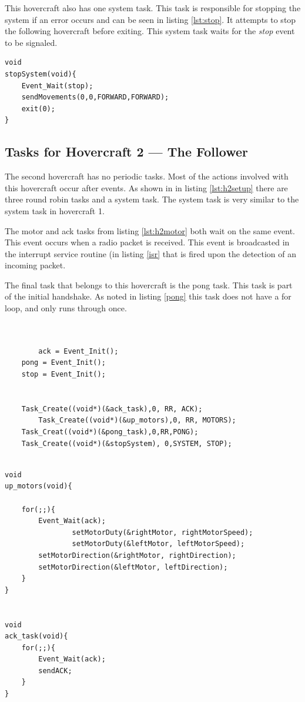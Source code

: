 This hovercraft also has one system task. This task is responsible for
stopping the system if an error occurs and can be seen in listing \ref{lst:stop}. It attempts to stop the following
hovercraft before exiting. This system task waits for the \textit{stop} event
to be signaled.

\begin{lstlisting}[label=lst:stop, float=th, caption={\texttt{STOP} Task}]
void
stopSystem(void){
	Event_Wait(stop);
	sendMovements(0,0,FORWARD,FORWARD);
	exit(0);
}

\end{lstlisting}



\subsection{Tasks for Hovercraft 2 --- The Follower}

The second hovercraft has no periodic tasks. Most of the actions involved with
this hovercraft occur after events. As shown in in listing \ref{lst:h2setup}
there are three round robin tasks and a system task. The system task is very
similar to the system task in hovercraft 1. 


The motor and ack tasks from listing \ref{lst:h2motor} both wait on the same
event. This event occurs when a radio packet is received. This event is
broadcasted in the interrupt service routine (in listing \ref{isr} that is fired upon the detection
of an incoming packet.

The final task that belongs to this hovercraft is the pong task. This task is
part of the initial handshake. As noted in listing \ref{pong} this task does
not have a for loop, and only runs through once.

\begin{lstlisting}[label=lst:h2setup, float=th, caption={The Setup
calls for Hovercraft 2}]


        ack = Event_Init();
	pong = Event_Init();
	stop = Event_Init();

    
	Task_Create((void*)(&ack_task),0, RR, ACK);
        Task_Create((void*)(&up_motors),0, RR, MOTORS);
	Task_Creat((void*)(&pong_task),0,RR,PONG);
	Task_Create((void*)(&stopSystem), 0,SYSTEM, STOP);

 \end{lstlisting}



\begin{lstlisting}[label=lst:h2motor, float=th, caption={\texttt{MOTOR} Task}]

void
up_motors(void){

	for(;;){
		Event_Wait(ack);
                setMotorDuty(&rightMotor, rightMotorSpeed);	
                setMotorDuty(&leftMotor, leftMotorSpeed);
		setMotorDirection(&rightMotor, rightDirection);
		setMotorDirection(&leftMotor, leftDirection);
	}		
}	


void
ack_task(void){
	for(;;){
		Event_Wait(ack);
		sendACK;
	}
}

 \end{lstlisting}

